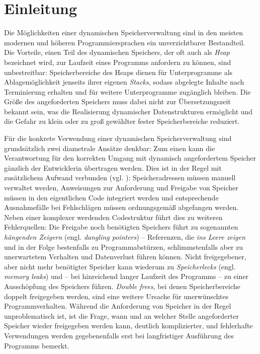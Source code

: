 \chapter{Einleitung}
\label{cha:intro}

Die Möglichkeiten einer dynamischen Speicherverwaltung sind in den meisten modernen und höheren Programmiersprachen ein unverzichtbarer Bestandteil.
Die Vorteile, einen Teil des dynamischen Speichers, der oft auch als \textit{Heap} bezeichnet wird, zur Laufzeit eines Programms anfordern zu können, sind unbestreitbar:
Speicherbereiche des Heaps dienen für Unterprogramme als Ablagemöglichkeit jenseits ihrer eigenen \textit{Stacks}, sodass abgelegte Inhalte nach Terminierung erhalten und für weitere Unterprogramme zugänglich bleiben.
Die Größe des angeforderten Speichers muss dabei nicht zur Übersetzungszeit bekannt sein, was die Realisierung dynamischer Datenstrukturen ermöglicht und die Gefahr zu klein oder zu groß gewählter fester Speicherbereiche reduziert.

Für die konkrete Verwendung einer dynamischen Speicherverwaltung sind grundsätzlich zwei diametrale Ansätze denkbar:
Zum einen kann die Verantwortung für den korrekten Umgang mit dynamisch angefordertem Speicher gänzlich der Entwicklerin übertragen werden.
Dies ist in der Regel mit zusätzlichem Aufwand verbunden (vgl. \cite[S. 1f]{wilson1992}):
Speicheradressen müssen manuell verwaltet werden, Anweisungen zur Anforderung und Freigabe von Speicher müssen in den eigentlichen Code integriert werden und entsprechende Ausnahmefälle bei Fehlschlägen müssen ordnungsgemäß abgefangen werden.
Neben einer komplexer werdenden Codestruktur führt dies zu weiteren Fehlerquellen:
Die Freigabe noch benötigten Speichers führt zu sogenannten \textit{hängenden Zeigern} (engl. \textit{dangling pointers}) -- Referenzen, die \textit{ins Leere zeigen} und in der Folge bestenfalls zu Programmabstürzen, schlimmstenfalls aber zu unerwartetem Verhalten und Datenverlust führen können.
Nicht freigegebener, aber nicht mehr benötigter Speicher kann wiederum zu \textit{Speicherlecks} (engl. \textit{memory leaks}) und -- bei hinreichend langer Laufzeit des Programms -- zu einer Ausschöpfung des Speichers führen.
\textit{Double frees}, bei denen Speicherbereiche doppelt freigegeben werden, sind eine weitere Ursache für unerwünschtes Programmverhalten.
Während die Anforderung von Speicher in der Regel unproblematisch ist, ist die Frage, wann und an welcher Stelle angeforderter Speicher wieder freigegeben werden kann, deutlich komplizierter, und fehlerhafte Verwendungen werden gegebenenfalls erst bei langfristiger Ausführung des Programms bemerkt.

